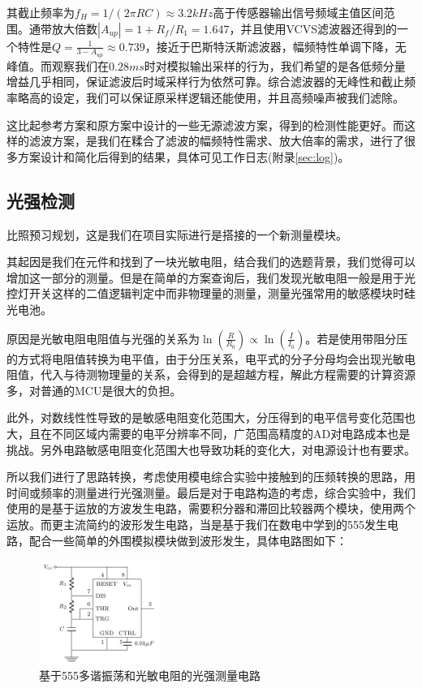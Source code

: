 \documentclass[a4paper, 11pt]{article} %
\begin{document}
其截止频率为$f_H = 1 / (2\pi RC) \approx 3.2kHz$高于传感器输出信号频域主值区间范围。通带放大倍数$|A_{up}| = 1 + R_f / R_1 = 1.647$，并且使用VCVS滤波器还得到的一个特性是$Q = \frac{1}{3 - A_{up}} \approx 0.739$，接近于巴斯特沃斯滤波器，幅频特性单调下降，无峰值。而观察我们在$0.28ms$时对模拟输出采样的行为，我们希望的是各低频分量增益几乎相同，保证滤波后时域采样行为依然可靠。综合滤波器的无峰性和截止频率略高的设定，我们可以保证原采样逻辑还能使用，并且高频噪声被我们滤除。

这比起参考方案\cite{cz2016yz}和原方案中设计的一些无源滤波方案，得到的检测性能更好。而这样的滤波方案，是我们在糅合了滤波的幅频特性需求、放大倍率的需求，进行了很多方案设计和简化后得到的结果，具体可见工作日志(附录\ref{sec:log})。

\subsection{光强检测}

比照预习规划，这是我们在项目实际进行是搭接的一个新测量模块。

其起因是我们在元件和找到了一块光敏电阻，结合我们的选题背景，我们觉得可以增加这一部分的测量。但是在简单的方案查询后，我们发现光敏电阻一般是用于光控灯开关这样的二值逻辑判定中而非物理量的测量，测量光强常用的敏感模块时硅光电池。

原因是光敏电阻电阻值与光强的关系为$\ln(\frac{R}{R_0}) \propto \ln(\frac{I}{I_0})$。若是使用带阻分压的方式将电阻值转换为电平值，由于分压关系，电平式的分子分母均会出现光敏电阻值，代入与待测物理量的关系，会得到的是超越方程，解此方程需要的计算资源多，对普通的MCU是很大的负担。

此外，对数线性性导致的是敏感电阻变化范围大，分压得到的电平信号变化范围也大，且在不同区域内需要的电平分辨率不同，广范围高精度的AD对电路成本也是挑战。另外电路敏感电阻变化范围大也导致功耗的变化大，对电源设计也有要求。

所以我们进行了思路转换，考虑使用模电综合实验中接触到的压频转换的思路，用时间或频率的测量进行光强测量。最后是对于电路构造的考虑，综合实验中，我们使用的是基于运放的方波发生电路，需要积分器和滞回比较器两个模块，使用两个运放。而更主流简约的波形发生电路，当是基于我们在数电中学到的555发生电路，配合一些简单的外围模拟模块做到波形发生，具体电路图如下：

\begin{figure}[H]
  \centering
  \includegraphics[width = 0.35\textwidth]{555_osc.pdf}
  \caption{基于555多谐振荡和光敏电阻的光强测量电路}
\end{figure}
\end{document}
